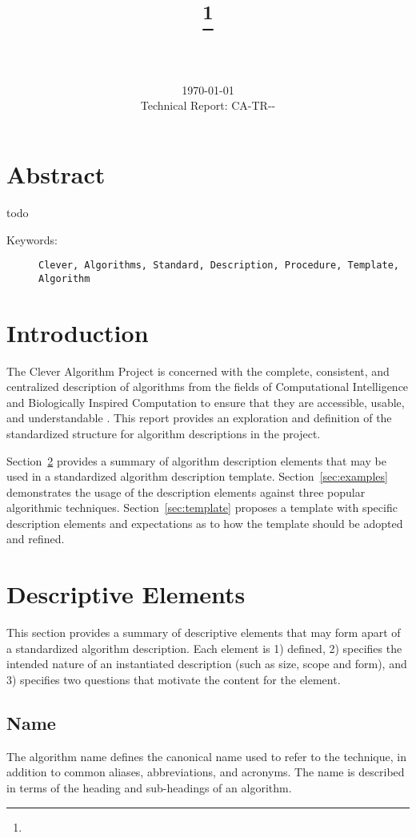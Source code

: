 \documentclass[a4paper, 11pt]{article}
\title{{\myreporttitle}\footnote{\myreportlicense}}
\author{\myreportauthor\\{\myreportemail}\\\small\myreportproject}
\date{\today\\{\small{Technical Report: CA-TR-{\myreportdate}-\myreportversion}}}
\begin{document}
\maketitle

\section*{Abstract} 
todo

\begin{description}
	\item[Keywords:] {\small\texttt{Clever, Algorithms, Standard, Description, Procedure, Template, Algorithm}}
\end{description} 

\section{Introduction}
\label{sec:introduction}
The Clever Algorithm Project is concerned with the complete, consistent, and centralized description of algorithms from the fields of Computational Intelligence and Biologically Inspired Computation to ensure that they are accessible, usable, and understandable \cite{Brownlee2010}.
This report provides an exploration and definition of the standardized structure for algorithm descriptions in the project.

Section~\ref{sec:elements} provides a summary of algorithm description elements that may be used in a standardized algorithm description template. Section~\ref{sec:examples} demonstrates the usage of the description elements against three popular algorithmic techniques. Section~\ref{sec:template} proposes a template with specific description elements and expectations as to how the template should be adopted and refined.

\section{Descriptive Elements}
\label{sec:elements}
This section provides a summary of descriptive elements that may form apart of a standardized algorithm description. Each element is 1) defined, 2) specifies the intended nature of an instantiated description (such as size, scope and form), and 3) specifies two questions that motivate the content for the element.

\subsection{Name}
The algorithm name defines the canonical name used to refer to the technique, in addition to common aliases, abbreviations, and acronyms. The name is described in terms of the heading and sub-headings of an algorithm.
\end{document}
